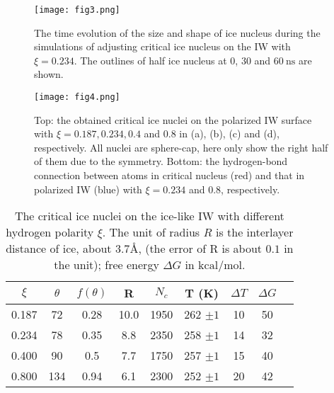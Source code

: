 \documentclass[aps,prl,twocolumn,superscriptaddress]{revtex4-1}
\begin{document}
\begin{figure}[ht]
\centering{}\texttt{[image: fig3.png]} 
\caption{ The time evolution of the size and shape of ice nucleus during the simulations of adjusting critical ice nucleus  on the IW with $\xi=0.234$. The outlines of half ice nucleus at $0$, $30$ and $60~\mathrm{ns}$ are shown.  
\label{fig:fig3} }
\end{figure}

\begin{figure}[ht]
\centering{}\texttt{[image: fig4.png]} 
\caption{ Top: the obtained critical ice nuclei on the polarized IW surface with $\xi = 0.187, 0.234, 0.4$ and $0.8$ in (a), (b), (c) and (d), respectively. All nuclei are sphere-cap, here only show the right half of them due to the symmetry. Bottom:  the hydrogen-bond connection between atoms in critical nucleus (red) and that in polarized IW (blue) with $\xi =0.234$ and $0.8$, respectively. 
\label{fig:fig4} }
\end{figure}

\begin{table}
\caption{The critical ice nuclei on the ice-like IW with different hydrogen polarity $\xi$. The unit of radius $R$ is the interlayer distance of ice, about $3.7$\AA, (the error of R is about $0.1$ in the unit); free energy $\Delta G$ in $\mathrm{kcal/mol}$.}

\centering{}%
\begin{tabular}{ccccccccc}
\hline
{ $\xi$} & {$\theta$} & { $f\left(\theta\right)$}  & {R}  & {$N_c$} & {T (K)} & {  $\Delta T$}  & {$\Delta G$ }\tabularnewline
\hline
{ 0.187} & { 72} & {0.28}  & {10.0}  & {1950} & {262 $\pm 1$} & {10} & {50}\tabularnewline
{ 0.234} & { 78} & {0.35} & { 8.8}  & {2350} & {258 $\pm 1$} & {14} & {32} \tabularnewline
	{ 0.400} & { 90} & {0.5 }  &{ 7.7} & {1750} & {257 $\pm 1$} & {15} & {40} \tabularnewline
{ 0.800} & {134} & {0.94}  &{ 6.1}  & {2300} & {252 $\pm 1$} & { 20} & {42}\tabularnewline
\hline
\end{tabular}
\label{table:tab1}
\end{table}
\end{document}
